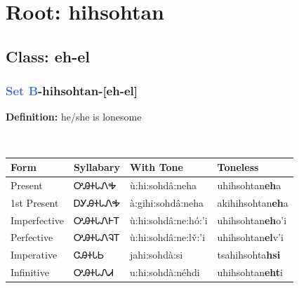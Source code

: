 \needspace{4in}
\section*{Root: hihsohtan}
\nopagebreak
{}
\needspace{3in}
\subsection*{Class: eh-el}
\nopagebreak
\needspace{2in}
\subsubsection*{\textcolor{RoyalBlue}{Set B}{-}\textbf{hihsohtan}{-}[eh-el]}
\nopagebreak
\textbf{Definition: } he/she is lonesome
\\[0.5em]
\begin{tabularx}{\textwidth}{l X X X}%
\toprule%
\textbf{Form}&\textbf{Syllabary}&\textbf{With Tone}&\textbf{Toneless}\\%
\midrule%
Present&ᎤᎯᏐᏓᏁᎭ&ù:hi:sohdâ:neha&uhihsohtan\textbf{eh}a\\%
1st Present&ᎠᎩᎯᏐᏓᏁᎭ&à:gihi:sohdâ:neha&akihihsohtan\textbf{eh}a\\%
Imperfective&ᎤᎯᏐᏓᏁᎰᎢ&ù:hi:sohdâ:ne:hó:’i&uhihsohtan\textbf{eh}o'i\\%
Perfective&ᎤᎯᏐᏓᏁᎸᎢ&ù:hi:sohdâ:ne:lv̌:’i&uhihsohtan\textbf{el}v'i\\%
Imperative&ᏣᎯᏐᏓᏏ&jahi:sohdà:si&tsahihsohta\textbf{hsi}\\%
Infinitive&ᎤᎯᏐᏓᏁᏗ&u:hi:sohdà:néhdi&uhihsohtan\textbf{eht}i\\%
\bottomrule%
\end{tabularx}
\\[1em]